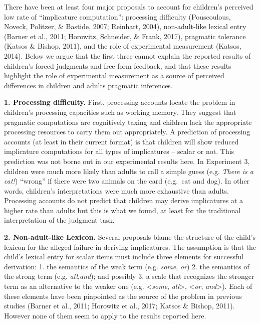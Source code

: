 \documentclass[,man,floatsintext]{apa6}
\begin{document}
There have been at least four major proposals to account for children's perceived low rate of \enquote{implicature computation}: processing difficulty (Pouscoulous, Noveck, Politzer, \& Bastide, 2007; Reinhart, 2004), non-adult-like lexical entry (Barner et al., 2011; Horowitz, Schneider, \& Frank, 2017), pragmatic tolerance (Katsos \& Bishop, 2011), and the role of experimental measurement (Katsos, 2014). Below we argue that the first three cannot explain the reported results of children's forced judgments and free-form feedback, and that these results highlight the role of experimental measurement as a source of perceived differences in children and adults pragmatic inferences.

\textbf{1. Processing difficulty.} First, processing accounts locate the problem in children's processing capacities such as working memory. They suggest that pragmatic computations are cognitively taxing and children lack the appropriate processing resources to carry them out appropriately. A prediction of processing accounts (at least in their current format) is that children will show reduced implicature computations for all types of implicatures -- scalar or not. This prediction was not borne out in our experimental results here. In Experiment 3, children were much more likely than adults to call a simple guess (e.g. \emph{There is a cat!}) \enquote{wrong} if there were two animals on the card (e.g.~cat and dog). In other words, children's interpretations were much more exhaustive than adults. Processing accounts do not predict that children may derive implicatures at a higher rate than adults but this is what we found, at least for the traditional interpretation of the judgment task.

\textbf{2. Non-adult-like Lexicon.} Several proposals blame the structure of the child's lexicon for the alleged failure in deriving implicatures. The assumption is that the child's lexical entry for scalar items must include three elements for successful derivation: 1. the semantics of the weak term (e.g. \emph{some}, \emph{or}) 2. the semantics of the strong term (e.g. \emph{all},\emph{and}); and possibly 3. a scale that recognizes the stronger term as an alternative to the weaker one (e.g. \textless{}\emph{some}, \emph{all}\textgreater{}, \textless{}\emph{or}, \emph{and}\textgreater{}). Each of these elements have been pinpointed as the source of the problem in previous studies (Barner et al., 2011; Horowitz et al., 2017; Katsos \& Bishop, 2011). However none of them seem to apply to the results reported here.
\end{document}

